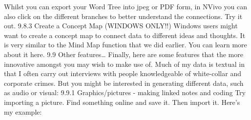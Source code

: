 \documentclass[
]{book}
\begin{document}
Whilst you can export your Word Tree into jpeg or PDF form, in NVivo you can also click on the different branches to better understand the connections. Try it out.
9.8.3 Create a Concept Map (WINDOWS ONLY!!)
Windows users might want to create a concept map to connect data to different ideas and thoughts. It is very similar to the Mind Map function that we did earlier. You can learn more about it here.
9.9 Other features\ldots{}
Finally, here are some features that the more innovative amongst you may wish to make use of. Much of my data is textual in that I often carry out interviews with people knowledgeable of white-collar and corporate crimes. But you might be interested in generating different data, such as audio or visual:
9.9.1 Graphics/pictures - making linked notes and coding
Try importing a picture. Find something online and save it. Then import it. Here's my example:
\end{document}
